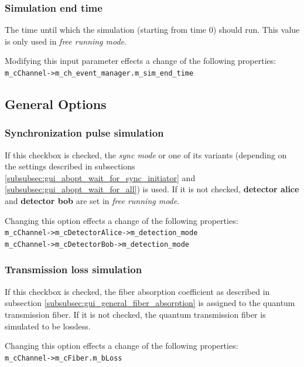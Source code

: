 \subsubsection{Simulation end time}
The time until which the simulation (starting from time 0) should run. This value is only used in \textit{free running mode}.

Modifying this input parameter effects a change of the following properties\hyperlink{fn:modinfo}{\footnotemark[\value{fnmodinfo}]}:\\
\texttt{m\_cChannel->m\_ch\_event\_manager.m\_sim\_end\_time}

\subsection{General Options}
\label{subsec:gui_general_options}

\subsubsection{Synchronization pulse simulation}
\label{subsubsec:gui_general_syncpulse}
If this checkbox is checked, the \textit{sync mode} or one of its variants (depending on the settings described in subsections \ref{subsubsec:gui_abopt_wait_for_sync_initiator} and \ref{subsubsec:gui_abopt_wait_for_all}) is used. If it is not checked, \textbf{detector alice} and \textbf{detector bob} are set in \textit{free running mode}.

Changing this option effects a change of the following properties\hyperlink{fn:modinfo}{\footnotemark[\value{fnmodinfo}]}:\\
\texttt{m\_cChannel->m\_cDetectorAlice->m\_detection\_mode}\\
\texttt{m\_cChannel->m\_cDetectorBob->m\_detection\_mode}

\subsubsection{Transmission loss simulation}
\label{subsubsec:gui_general_options_transmission_loss_simulation}
If this checkbox is checked, the fiber absorption coefficient as described in subsection \ref{subsubsec:gui_general_fiber_absorption} is assigned to the quantum transmission fiber. If it is not checked, the quantum transmission fiber is simulated to be lossless.

Changing this option effects a change of the following properties\hyperlink{fn:modinfo}{\footnotemark[\value{fnmodinfo}]}:\\
\texttt{m\_cChannel->m\_cFiber.m\_bLoss}

